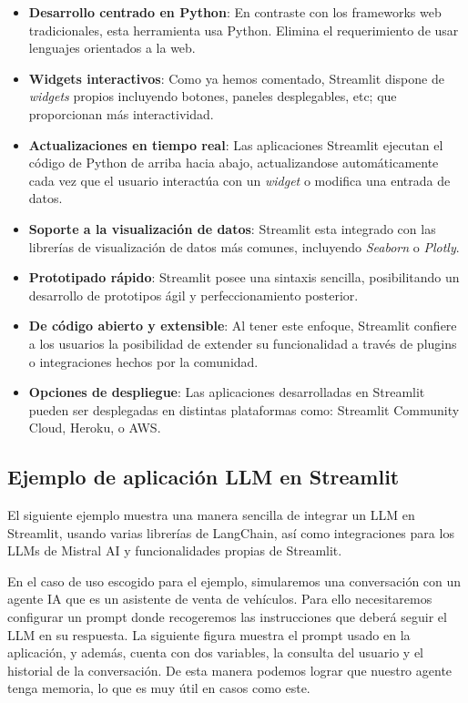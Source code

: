             \begin{itemize}
                \item \textbf{Desarrollo centrado en Python}: En contraste con los frameworks web tradicionales, esta herramienta usa Python. Elimina el requerimiento de usar lenguajes orientados a la web.
                \item \textbf{Widgets interactivos}: Como ya hemos comentado, Streamlit dispone de \textit{widgets} propios incluyendo botones, paneles desplegables, etc; que proporcionan más interactividad.
                \item \textbf{Actualizaciones en tiempo real}: Las aplicaciones Streamlit ejecutan el código de Python de arriba hacia abajo, actualizandose automáticamente cada vez que el usuario interactúa con un \textit{widget} o modifica una entrada de datos.
                \item \textbf{Soporte a la visualización de datos}: Streamlit esta integrado con las librerías de visualización de datos más comunes, incluyendo \textit{Seaborn} o \textit{Plotly}.
                \item \textbf{Prototipado rápido}: Streamlit posee una sintaxis sencilla, posibilitando un desarrollo de prototipos ágil y perfeccionamiento posterior.
                \item \textbf{De código abierto y extensible}: Al tener este enfoque, Streamlit confiere a los usuarios la posibilidad de extender su funcionalidad a través de plugins o integraciones hechos por la comunidad.
                \item \textbf{Opciones de despliegue}: Las aplicaciones desarrolladas en Streamlit pueden ser desplegadas en distintas plataformas como: Streamlit Community Cloud, Heroku, o AWS.
            \end{itemize}

        \subsection{Ejemplo de aplicación LLM en Streamlit}

            El siguiente ejemplo muestra una manera sencilla de integrar un LLM en Streamlit, usando varias librerías de LangChain, así como integraciones para los LLMs de Mistral AI y funcionalidades propias de Streamlit.

            \noindent En el caso de uso escogido para el ejemplo, simularemos una conversación con un agente IA que es un asistente de venta de vehículos. Para ello necesitaremos configurar un prompt donde recogeremos las instrucciones que deberá seguir el LLM en su respuesta. La siguiente figura muestra el prompt usado en la aplicación, y además, cuenta con dos variables, la consulta del usuario y el historial de la conversación. De esta manera podemos lograr que nuestro agente tenga memoria, lo que es muy útil en casos como este.
            
